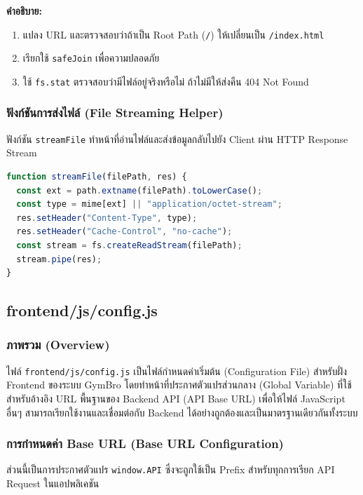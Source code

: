 \textbf{คำอธิบาย:}
\begin{enumerate}
    \item แปลง URL และตรวจสอบว่าถ้าเป็น Root Path (\texttt{/}) ให้เปลี่ยนเป็น \texttt{/index.html}
    \item เรียกใช้ \texttt{safeJoin} เพื่อความปลอดภัย
    \item ใช้ \texttt{fs.stat} ตรวจสอบว่ามีไฟล์อยู่จริงหรือไม่ ถ้าไม่มีให้ส่งคืน 404 Not Found
\end{enumerate}

\subsubsection{ฟังก์ชันการส่งไฟล์ (File Streaming Helper)}
ฟังก์ชัน \texttt{streamFile} ทำหน้าที่อ่านไฟล์และส่งข้อมูลกลับไปยัง Client ผ่าน HTTP Response Stream

\begin{lstlisting}[language=JavaScript, caption={ฟังก์ชัน streamFile}, label={code:frontend-index-stream}]
function streamFile(filePath, res) {
  const ext = path.extname(filePath).toLowerCase();
  const type = mime[ext] || "application/octet-stream";
  res.setHeader("Content-Type", type);
  res.setHeader("Cache-Control", "no-cache");
  const stream = fs.createReadStream(filePath);
  stream.pipe(res);
}
\end{lstlisting}


\subsection{frontend/js/config.js}

\subsubsection{ภาพรวม (Overview)}
ไฟล์ \texttt{frontend/js/config.js} เป็นไฟล์กำหนดค่าเริ่มต้น (Configuration File) สำหรับฝั่ง Frontend ของระบบ GymBro โดยทำหน้าที่ประกาศตัวแปรส่วนกลาง (Global Variable) ที่ใช้สำหรับอ้างอิง URL พื้นฐานของ Backend API (API Base URL) เพื่อให้ไฟล์ JavaScript อื่นๆ สามารถเรียกใช้งานและเชื่อมต่อกับ Backend ได้อย่างถูกต้องและเป็นมาตรฐานเดียวกันทั้งระบบ

\subsubsection{การกำหนดค่า Base URL (Base URL Configuration)}
ส่วนนี้เป็นการประกาศตัวแปร \texttt{window.API} ซึ่งจะถูกใช้เป็น Prefix สำหรับทุกการเรียก API Request ในแอปพลิเคชัน

